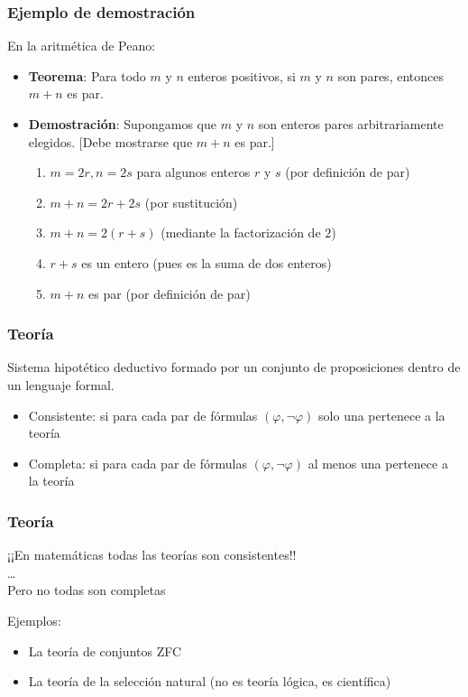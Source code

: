 \begin{frame}
\frametitle{Ejemplo de demostración}

En la aritmética de Peano:
\begin{itemize}
 \item {\color{red} \textbf{Teorema}: Para todo $m$ y $n$ enteros positivos, si $m$ y $n$ son pares, entonces $m+n$ es par.}
 \item \textbf{Demostración}: Supongamos que $m$ y $n$ son enteros pares arbitrariamente elegidos. [Debe mostrarse que $m+n$ es par.]\\
  \begin{enumerate}[1.]
  	\item $m = 2r, n = 2s$ para algunos enteros $r$ y $s$ (por definición de par)
  	\item $m + n = 2r + 2s$ (por sustitución)
  	\item $m + n = 2(r + s)$ (mediante la factorización de $2$)
  	\item $r + s$ es un entero (pues es la suma de dos enteros)
  	\item $m + n$ es par (por definición de par)
  \end{enumerate}
\end{itemize}
\end{frame}


\begin{frame}
\frametitle{Teoría}

Sistema hipotético deductivo formado por un conjunto de proposiciones dentro de un lenguaje formal.\\

\pause
\begin{itemize}
 \item Consistente: si para cada par de fórmulas $(\varphi,\neg \varphi)$ solo una pertenece a la teoría
 \item Completa: si para cada par de fórmulas $(\varphi,\neg \varphi)$ al menos una pertenece a la teoría
\end{itemize}
\end{frame}

\begin{frame}
	\frametitle{Teoría}
			
\begin{center}
	¡¡En matemáticas todas las teorías son consistentes!!\\
	\dots\\
	Pero no todas son completas
\end{center}

\pause
Ejemplos:
\begin{itemize}
	\item La teoría de conjuntos ZFC 
	\item La teoría de la selección natural (no es teoría lógica, es científica)
\end{itemize}

\end{frame}

